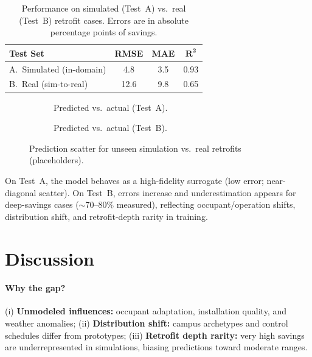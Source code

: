 \documentclass{article}
\begin{document}
\begin{table}[t]
\centering
\caption{Performance on simulated (Test~A) vs.\ real (Test~B) retrofit cases. Errors are in absolute percentage points of savings.}
\label{tab:main}
\begin{tabular}{lccc}
\toprule
\textbf{Test Set} & \textbf{RMSE} & \textbf{MAE} & $\mathbf{R^2}$ \\
\midrule
A.\ Simulated (in-domain) & 4.8  & 3.5 & 0.93 \\
B.\ Real (sim-to-real)    & 12.6 & 9.8 & 0.65 \\
\bottomrule
\end{tabular}
\end{table}

\begin{figure}[t]
  \centering
  \begin{subfigure}{0.47\linewidth}
    \centering
    \fbox{\rule[-.5cm]{0pt}{4.0cm}\rule[-.5cm]{5.5cm}{0pt}}
    \caption{Predicted vs.\ actual (Test~A).}
  \end{subfigure}\hfill
  \begin{subfigure}{0.47\linewidth}
    \centering
    \fbox{\rule[-.5cm]{0pt}{4.0cm}\rule[-.5cm]{5.5cm}{0pt}}
    \caption{Predicted vs.\ actual (Test~B).}
  \end{subfigure}
  \caption{Prediction scatter for unseen simulation vs.\ real retrofits (placeholders).}
  \label{fig:pvsa}
\end{figure}

On Test~A, the model behaves as a high-fidelity surrogate (low error; near-diagonal scatter). 
On Test~B, errors increase and underestimation appears for deep-savings cases ($\sim$70--80\% measured), reflecting occupant/operation shifts, distribution shift, and retrofit-depth rarity in training.

\section{Discussion}
\paragraph{Why the gap?} 
(i) \textbf{Unmodeled influences:} occupant adaptation, installation quality, and weather anomalies; 
(ii) \textbf{Distribution shift:} campus archetypes and control schedules differ from prototypes; 
(iii) \textbf{Retrofit depth rarity:} very high savings are underrepresented in simulations, biasing predictions toward moderate ranges.
\end{document}
